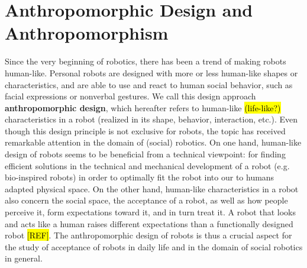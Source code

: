 \documentclass[twocolumn]{svjour3}          %
\begin{document}
%
%
%
%
%
%


\section{Anthropomorphic Design and Anthropomorphism}
\label{sec:intro}

	 Since the very beginning of robotics, there has been a trend of making robots human-like. Personal robots are designed with more or less human-like shapes or characteristics, and are able to use and react to human social behavior, such as facial expressions or nonverbal gestures. We call this design approach \textbf{anthropomorphic design}, which hereafter refers to human-like \hl{(life-like?)} characteristics in a robot (realized in its shape, behavior, interaction, etc.). Even though this design principle is not exclusive for robots, the topic has received remarkable attention in the domain of (social) robotics. On one hand, human-like design of robots seems to be beneficial from a technical viewpoint: for finding efficient solutions in the technical and mechanical development of a robot (e.g. bio-inspired robots) in order to optimally fit the robot into our to humans adapted physical space. On the other hand, human-like characteristics in a robot also concern the social space, the acceptance of a robot, as well as how people perceive it, form expectations toward it, and in turn treat it. A robot that looks and acts like a human raises different expectations than a functionally designed robot \hl{[REF]}. The anthropomorphic design of robots is thus a crucial aspect for the study of acceptance of robots in daily life and in the domain of social robotics in general. 
	
\end{document}
